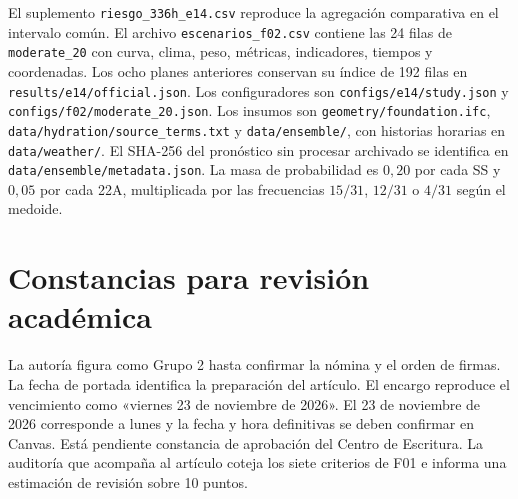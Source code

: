 \documentclass[11pt,a4paper]{article}
\newcommand{\plan}[1]{\texttt{#1}}
\begin{document}
El suplemento \nolinkurl{riesgo_336h_e14.csv} reproduce la agregación comparativa en el intervalo común. El archivo \plan{escenarios\_f02.csv} contiene las 24 filas de \plan{moderate\_20} con curva, clima, peso, métricas, indicadores, tiempos y coordenadas. Los ocho planes anteriores conservan su índice de 192 filas en \plan{results/e14/official.json}. Los configuradores son \plan{configs/e14/study.json} y \plan{configs/f02/moderate\_20.json}. Los insumos son \nolinkurl{geometry/foundation.ifc}, \nolinkurl{data/hydration/source_terms.txt} y \nolinkurl{data/ensemble/}, con historias horarias en \plan{data/weather/}. El SHA-256 del pronóstico sin procesar archivado se identifica en \plan{data/ensemble/metadata.json}. La masa de probabilidad es $0{,}20$ por cada SS y $0{,}05$ por cada 22A, multiplicada por las frecuencias $15/31$, $12/31$ o $4/31$ según el medoide.

\section{Constancias para revisión académica}
La autoría figura como Grupo 2 hasta confirmar la nómina y el orden de firmas. La fecha de portada identifica la preparación del artículo. El encargo reproduce el vencimiento como «viernes 23 de noviembre de 2026». El 23 de noviembre de 2026 corresponde a lunes y la fecha y hora definitivas se deben confirmar en Canvas. Está pendiente constancia de aprobación del Centro de Escritura. La auditoría que acompaña al artículo coteja los siete criterios de F01 e informa una estimación de revisión sobre 10 puntos.
\end{document}
